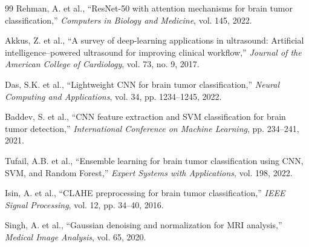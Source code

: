 \documentclass[conference]{IEEEtran}
\begin{document}
\begin{thebibliography}{99}
 Rehman, A. et al., ``ResNet-50 with attention mechanisms for brain tumor classification,'' \textit{Computers in Biology and Medicine}, vol. 145, 2022.

 Akkus, Z. et al., ``A survey of deep-learning applications in ultrasound: Artificial intelligence--powered ultrasound for improving clinical workflow,'' \textit{Journal of the American College of Cardiology}, vol. 73, no. 9, 2017.

 Das, S.K. et al., ``Lightweight CNN for brain tumor classification,'' \textit{Neural Computing and Applications}, vol. 34, pp. 1234--1245, 2022.

 Baddev, S. et al., ``CNN feature extraction and SVM classification for brain tumor detection,'' \textit{International Conference on Machine Learning}, pp. 234--241, 2021.

 Tufail, A.B. et al., ``Ensemble learning for brain tumor classification using CNN, SVM, and Random Forest,'' \textit{Expert Systems with Applications}, vol. 198, 2022.

 Isin, A. et al., ``CLAHE preprocessing for brain tumor classification,'' \textit{IEEE Signal Processing}, vol. 12, pp. 34--40, 2016.

 Singh, A. et al., ``Gaussian denoising and normalization for MRI analysis,'' \textit{Medical Image Analysis}, vol. 65, 2020.

\end{thebibliography}
\end{document}
